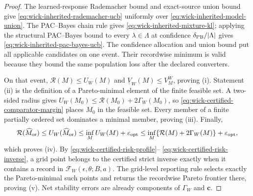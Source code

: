 \documentclass[11pt]{article}
\numberwithin{section}{part}
\theoremstyle{plain}
\theoremstyle{definition}
\theoremstyle{remark}
\begin{document}
\begin{proof}
The learned-response Rademacher bound and exact-source union bound give
\eqref{eq:wick-inherited-rademacher-ucb} uniformly over
\eqref{eq:wick-inherited-model-union}.  The PAC--Bayes chain rule gives
\eqref{eq:wick-inherited-mixture-kl}; applying the structural PAC--Bayes
bound to every \(\lambda\in\Lambda\) at confidence
\(\delta_{\rm PB}/|\Lambda|\) gives
\eqref{eq:wick-inherited-pac-bayes-ucb}.  The confidence allocation and union
bound put all applicable candidates on one event.  Their recordwise minimum
is valid because they bound the same population loss after the declared
converters.

On that event,
\(\mathcal R(M)\le U_W(M)\) and
\(\underline V_W(M)\le V_M^W\), proving \textup{(i)}.  Statement
\textup{(ii)} is the definition of a Pareto-minimal element of the finite
feasible set.  A two-sided radius gives
\(U_W(M_0)\le\mathcal R(M_0)+2\Gamma_W(M_0)\), so
\eqref{eq:wick-certified-comparator-margin} places \(M_0\) in the feasible
set.  Every member of a finite partially ordered set dominates a minimal
member, proving \textup{(iii)}.  Finally,
\[
 \mathcal R(\widehat M_{\rm or})
 \le U_W(\widehat M_{\rm or})
 \le\inf_MU_W(M)+\varepsilon_{\rm opt}
 \le\inf_M\{\mathcal R(M)+2\Gamma_W(M)\}+\varepsilon_{\rm opt},
\]
which proves \textup{(iv)}.  By
\eqref{eq:wick-certified-risk-profile}--
\eqref{eq:wick-certified-risk-inverse}, a grid point belongs to the certified
strict inverse exactly when it contains a record in
\(\mathscr F_W(\epsilon,\theta;B,a)\).  The grid-level reporting rule selects
exactly the Pareto-minimal such points and returns the recordwise Pareto
frontier there, proving \textup{(v)}.  Net stability errors are already components of
\(\Gamma_W\) and \(\mathbf c\).
\end{proof}
\end{document}
